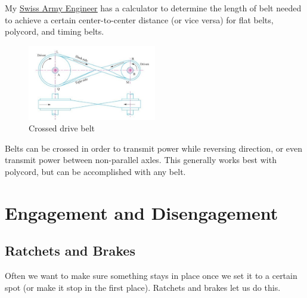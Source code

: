 \documentclass[10pt,letterpaper]{book}
\begin{document}
My \href{http://thaddeus-maximus.github.io/swissarmyengineer/}{\color{red}\underline{Swiss Army Engineer}} has a calculator to determine the length of belt needed to achieve a certain center-to-center distance (or vice versa) for flat belts, polycord, and timing belts.

\begin{figure}[H]
	\includegraphics[width=0.5\textwidth]{imgs/belt_crossed.png}
	\caption{Crossed drive belt}
\end{figure}
	Belts can be crossed in order to transmit power while reversing direction, or even transmit power between non-parallel axles. This generally works best with polycord, but can be accomplished with any belt.

\newpage
\section{Engagement and Disengagement}

\subsection{Ratchets and Brakes}

Often we want to make sure something stays in place once we set it to a certain spot (or make it stop in the first place). Ratchets and brakes let us do this.
\end{document}
